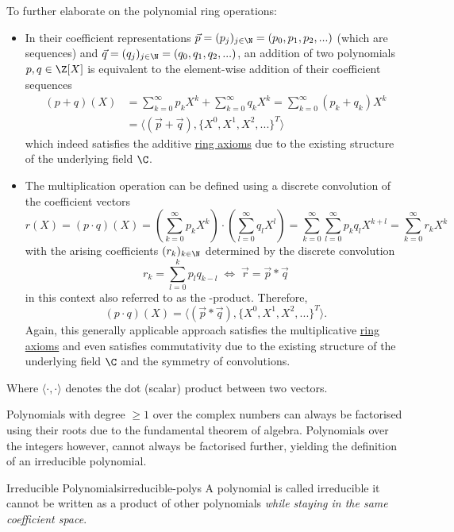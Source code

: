To further elaborate on the polynomial ring operations:
\begin{itemize}
  \item In their coefficient representations $\vec{p} = (p_j)_{j\in\N} = (p_0, p_1, p_2, ...)$ (which are sequences) and $\vec{q} = (q_j)_{j\in\N} = (q_0, q_1, q_2, ...)$,
        an addition of two polynomials $p, q \in \Z[X]$ is equivalent to the element-wise addition of their coefficient sequences
        \begin{align*}
          (p + q)(X) & = \sum_{k=0}^\infty p_k X^k + \sum_{k=0}^\infty q_k X^k = \sum_{k=0}^\infty (p_k + q_k) X^k \\
                     & = \langle (\vec{p} + \vec{q}), \{X^0, X^1, X^2, ...\}^T \rangle
        \end{align*}
        which indeed satisfies the additive \hyperref[def:ring]{ring axioms}
        due to the existing structure of the underlying field $\C$.
  \item The multiplication operation can be defined using a discrete convolution of the coefficient vectors
        $$r(X) = (p \cdot q)(X) = (\sum_{k=0}^\infty p_k X^k) \cdot (\sum_{l=0}^\infty q_l X^l)
          = \sum_{k=0}^\infty \sum_{l=0}^\infty p_k q_l X^{k+l}
          = \sum_{k=0}^\infty r_k X^k$$
        with the arising coefficients $(r_k)_{k\in\N}$ determined by the discrete convolution
        $$r_k = \sum_{l=0}^k p_l q_{k-l} \;\Leftrightarrow\; \vec{r} = \vec{p} * \vec{q}$$
        in this context also referred to as the -product. Therefore,
        $$(p \cdot q)(X) = \langle (\vec{p} * \vec{q}), \{X^0, X^1, X^2, ...\}^T \rangle.$$
        Again, this generally applicable approach satisfies the multiplicative \hyperref[def:ring]{ring axioms}
        and even satisfies commutativity due to the existing structure of the underlying field $\C$
        and the symmetry of convolutions.
\end{itemize}

Where $\langle \cdot, \cdot \rangle$ denotes the dot (scalar) product between two vectors.

Polynomials with degree $\geq 1$ over the complex numbers can always be factorised using their roots due to the fundamental theorem of algebra.
Polynomials over the integers however, cannot always be factorised further, yielding the definition of an irreducible polynomial.

\begin{definition}{Irreducible Polynomials}{irreducible-polys}
  A polynomial is called irreducible  it cannot be written as a product of other polynomials
  \textsl{while staying in the same coefficient space}.
\end{definition}

